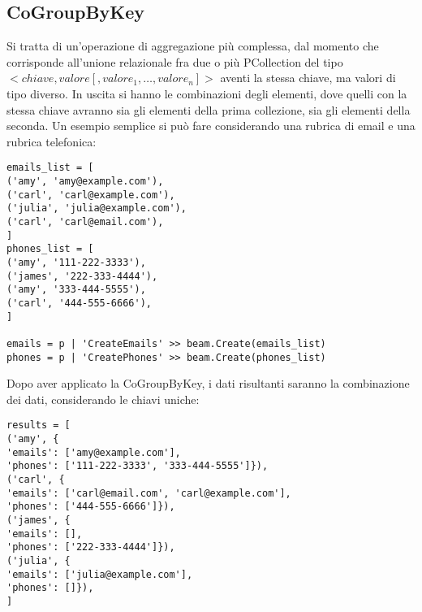 \subsection{CoGroupByKey}
Si tratta di un’operazione di aggregazione più complessa, dal momento che corrisponde all’unione relazionale fra due o più PCollection del tipo $ <chiave, valore [, valore_{1}, …, valore_{n}]> $ aventi la stessa chiave, ma valori di tipo diverso. In uscita si hanno le combinazioni degli elementi, dove quelli con la stessa chiave avranno sia gli elementi della prima collezione, sia gli elementi della seconda.
Un esempio semplice si può fare considerando una rubrica di email e una rubrica telefonica:
\begin{lstlisting}
emails_list = [
('amy', 'amy@example.com'),
('carl', 'carl@example.com'),
('julia', 'julia@example.com'),
('carl', 'carl@email.com'),
]
phones_list = [
('amy', '111-222-3333'),
('james', '222-333-4444'),
('amy', '333-444-5555'),
('carl', '444-555-6666'),
]

emails = p | 'CreateEmails' >> beam.Create(emails_list)
phones = p | 'CreatePhones' >> beam.Create(phones_list)
\end{lstlisting}
Dopo aver applicato la CoGroupByKey, i dati risultanti saranno la combinazione dei dati, considerando le chiavi uniche:
\begin{lstlisting}
results = [
('amy', {
'emails': ['amy@example.com'],
'phones': ['111-222-3333', '333-444-5555']}),
('carl', {
'emails': ['carl@email.com', 'carl@example.com'],
'phones': ['444-555-6666']}),
('james', {
'emails': [],
'phones': ['222-333-4444']}),
('julia', {
'emails': ['julia@example.com'],
'phones': []}),
]
\end{lstlisting}
